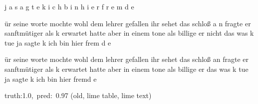 \documentclass[a4paper,10pt,twoside]{article}
\begin{document}
{\color[rgb]{0.139,0,0} j}{\color[rgb]{0.155,0,0} a} {\color[rgb]{0.045,0,0} s}{\color[rgb]{0.077,0,0} a}{\color[rgb]{0.733,0,0} g}{\color[rgb]{1,0,0} t}{\color[rgb]{0.771,0,0} e} {\color[rgb]{1,0,0} k} {\color[rgb]{1,0,0} i}{\color[rgb]{1,0,0} c}{\color[rgb]{1,0,0} h} {\color[rgb]{0.0,0,0} b}{\color[rgb]{0.0,0,0} i}{\color[rgb]{1,0,0} n} {\color[rgb]{1,0,0} h}{\color[rgb]{1,0,0} i}{\color[rgb]{1,0,0} e}{\color[rgb]{1,0,0} r} {\color[rgb]{1,0,0} f}{\color[rgb]{1,0,0} r}{\color[rgb]{1,0,0} e}{\color[rgb]{1,0,0} m}{\color[rgb]{1,0,0} d} {\color[rgb]{0.0,0,0} e}

ür seine worte mochte wohl dem lehrer gefallen ihr sehet das schloß a{\color[rgb]{1,0,0} n} fragte er sanftmütiger als k erwartet hatte {\color[rgb]{1,0,0} a}ber in einem tone {\color[rgb]{1,0,0} a}ls billige er nicht das was k tue {\color[rgb]{1,0,0} j}a sagte k ich bin hier frem{\color[rgb]{1,0,0} d} e

 ür {\color[rgb]{1,0,0} seine} worte mochte wohl dem lehrer gefallen ihr {\color[rgb]{1,0,0} sehet} das {\color[rgb]{1,0,0} schloß} an fragte {\color[rgb]{1,0,0} er} sanftmütiger als k erwartet hatte aber in einem tone als billige {\color[rgb]{1,0,0} er}  das was k tue ja sagte k ich bin hier fremd e

 {\footnotesize {\color[rgb]{0.6, 0.6, 0.6}truth:1.0,~pred:~0.97}} (old, lime table, lime text)\hrulefill
\end{document}
